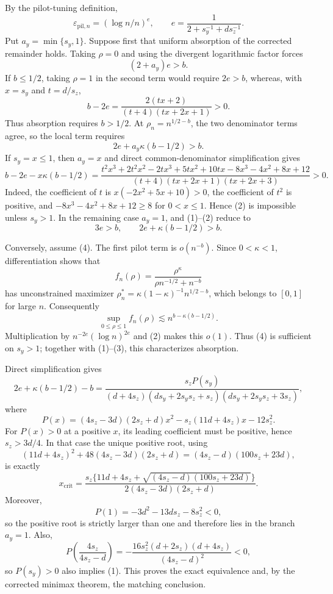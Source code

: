 By the pilot-tuning definition,
\[
\varepsilon_{\mathrm{pil},n}=(\log n/n)^e,
\qquad
e=\frac{1}{2+s_y^{-1}+ds_z^{-1}}.
\]
Put \(a_y=\min\{s_y,1\}\).  Suppose first that uniform absorption of the corrected remainder holds.  Taking \(\rho=0\) and using the divergent logarithmic factor forces
\[
(2+a_y)e>b.                                                               \tag{1}
\]
If \(b\le1/2\), taking \(\rho=1\) in the second term would require \(2e>b\), whereas, with \(x=s_y\) and \(t=d/s_z\),
\[
b-2e=\frac{2(tx+2)}{(t+4)(tx+2x+1)}>0.
\]
Thus absorption requires \(b>1/2\).  At \(\rho_n=n^{1/2-b}\), the two denominator terms agree, so the local term requires
\[
2e+a_y\kappa(b-1/2)>b.                                                    \tag{2}
\]
If \(s_y=x\le1\), then \(a_y=x\) and direct common-denominator simplification gives
\[
b-2e-x\kappa(b-1/2)
=\frac{t^2x^3+2t^2x^2-2tx^3+5tx^2+10tx-8x^3-4x^2+8x+12}
{(t+4)(tx+2x+1)(tx+2x+3)}>0.                                             \tag{3}
\]
Indeed, the coefficient of \(t\) is \(x(-2x^2+5x+10)>0\), the coefficient of \(t^2\) is positive, and \(-8x^3-4x^2+8x+12\ge8\) for \(0<x\le1\).  Hence (2) is impossible unless \(s_y>1\).  In the remaining case \(a_y=1\), and (1)--(2) reduce to
\[
3e>b,
\qquad
2e+\kappa(b-1/2)>b.                                                       \tag{4}
\]

Conversely, assume (4).  The first pilot term is \(o(n^{-b})\).  Since \(0<\kappa<1\), differentiation shows that
\[
f_n(\rho)=\frac{\rho^\kappa}{\rho n^{-1/2}+n^{-b}}
\]
has unconstrained maximizer \(\rho_n^*=\kappa(1-\kappa)^{-1}n^{1/2-b}\), which belongs to \([0,1]\) for large \(n\).  Consequently
\[
\sup_{0\le\rho\le1}f_n(\rho)\lesssim n^{b-\kappa(b-1/2)}.
\]
Multiplication by \(n^{-2e}(\log n)^{2e}\) and (2) makes this \(o(1)\).  Thus (4) is sufficient on \(s_y>1\); together with (1)--(3), this characterizes absorption.

Direct simplification gives
\[
2e+\kappa(b-1/2)-b
=\frac{s_zP(s_y)}
{(d+4s_z)(ds_y+2s_ys_z+s_z)(ds_y+2s_ys_z+3s_z)},                         \tag{5}
\]
where
\[
P(x)=(4s_z-3d)(2s_z+d)x^2-s_z(11d+4s_z)x-12s_z^2.
\]
For \(P(x)>0\) at a positive \(x\), its leading coefficient must be positive, hence \(s_z>3d/4\).  In that case the unique positive root, using
\[
(11d+4s_z)^2+48(4s_z-3d)(2s_z+d)=(4s_z-d)(100s_z+23d),
\]
is exactly
\[
x_{\mathrm{crit}}=
\frac{s_z\{11d+4s_z+\sqrt{(4s_z-d)(100s_z+23d)}\}}
{2(4s_z-3d)(2s_z+d)}.
\]
Moreover,
\[
P(1)=-3d^2-13ds_z-8s_z^2<0,
\]
so the positive root is strictly larger than one and therefore lies in the branch \(a_y=1\).  Also,
\[
P\!\left(\frac{4s_z}{4s_z-d}\right)
=-\frac{16s_z^2(d+2s_z)(d+4s_z)}{(4s_z-d)^2}<0,
\]
so \(P(s_y)>0\) also implies (1).  This proves the exact equivalence and, by the corrected minimax theorem, the matching conclusion.

